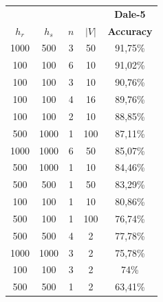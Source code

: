 \begin{table}[ht]
    \centering
    \begin{tabular}{cccc|c}
        \toprule
                                      &           &     &       & \multicolumn{1}{c}{\textbf{Dale-5}} \\  \cmidrule(lr){5-5}
        $h_r$                         & $h_s$     & $n$ & $|V|$ & \textbf{Accuracy}                   \\\midrule
        {1000}                        & {500}     & {3} & {50}  & {91,75\%}                           \\
        {100}                         & {100}     & {6} & {10}  & {91,02\%}                           \\
        {100}                         & {100}     & {3} & {10}  & {90,76\%}                           \\
        {100}                         & {100}     & {4} & {16}  & {89,76\%}                           \\
        {100}                         & {100}     & {2} & {10}  & {88,85\%}                           \\
        {500}                         & {1000}    & {1} & {100} & {87,11\%}                           \\
        {1000}                        & {1000}    & {6} & {50}  & {85,07\%}                           \\
        {500}                         & {1000}    & {1} & {10}  & {84,46\%}                           \\
        {500}                         & {500}     & {1} & {50}  & {83,29\%}                           \\
        {100}                         & {100}     & {1} & {10}  & {80,86\%}                           \\
        {500}                         & {100}     & {1} & {100} & {76,74\%}                           \\
        {500}                         & {500}     & {4} & {2}   & {77,78\%}                           \\
        {1000}                        & {1000}    & {3} & {2}   & {75,78\%}                           \\
        {100}                         & {100}     & {3} & {2}   & {74\%}                              \\
        {500}                         & {500}     & {1} & {2}   & {63,41\%}                           \\\midrule

\end{tabular}
\end{table}
